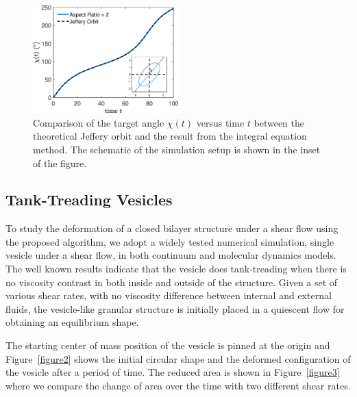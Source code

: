 \documentclass[lineno]{jfm}
\begin{document}
\begin{figure}[H]
\begin{center}
\includegraphics[width=0.5\textwidth]{JefferyOrbit.eps}
\end{center}
  \caption{Comparison of the target angle $\chi(t)$ versus time $t$ between the theoretical Jeffery orbit and the result from the integral equation method. The schematic of the simulation setup is shown in the inset of the figure.
  }
    \label{figure1}
\end{figure}



\subsection{Tank-Treading Vesicles}

To study the deformation of a closed bilayer structure under a shear flow using the proposed algorithm, 
we adopt a widely tested numerical simulation, single vesicle under a shear flow, in both continuum and molecular dynamics models. The well known results indicate that the vesicle does tank-treading when there is no viscosity contrast in both inside and outside of the structure.
Given a set of various shear rates, with no viscosity difference between internal and external fluids, 
the vesicle-like granular structure is initially placed in a quiescent flow for obtaining an equilibrium shape.

The starting center of mass position of the vesicle is pinned at the origin and Figure~\ref{figure2} shows 
the initial circular shape  and the deformed configuration of the vesicle after a period of time. 
The reduced area is shown in Figure~\ref{figure3} where we compare the change of area over the time with two different shear rates. 
\end{document}
